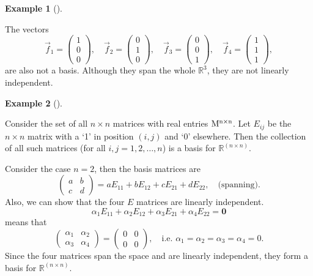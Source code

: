 \documentclass[
  a4paper,
  DIV=11,
  numbers=noendperiod,
  oneside]{scrreprt}
\theoremstyle{definition}
\newtheorem{example}{Example}[chapter]
\theoremstyle{remark}
\begin{document}
\begin{example}[]\protect\hypertarget{exm-}{}\label{exm-}

The vectors
\[\vec{f}_{1} =  \scriptscriptstyle \begin{pmatrix}   1\\ 0 \\ 0   \end{pmatrix} \textstyle, \quad \vec{f}_{2} =  \scriptscriptstyle \begin{pmatrix}   0\\ 1 \\ 0   \end{pmatrix} \textstyle, \quad \vec{f}_{3} =  \scriptscriptstyle \begin{pmatrix}   0\\ 0 \\ 1  \end{pmatrix} \textstyle, \quad  \vec{f}_{4} =  \scriptscriptstyle \begin{pmatrix}   1\\ 1 \\ 1   \end{pmatrix} \textstyle ,\]
are also not a basis. Although they span the whole \(\mathbb{R}^{3}\),
they are not linearly independent.

\end{example}

\begin{example}[]\protect\hypertarget{exm-}{}\label{exm-}

Consider the set of all \(n\times n\) matrices with real entries
\(\rm{M}^{n\times n}\). Let \(E_{ij}\) be the \(n\times n\) matrix with
a `1' in position \((i,j)\) and `0' elsewhere. Then the collection of
all such matrices (for all \(i,j=1,2,\ldots,n\)) is a basis for
\(\mathbb{R}^{(n\times n)}\).

Consider the case \(n=2\), then the basis matrices are
\[\left(\begin{array}{cc}
 a & b\\
 c & d
 \end{array}\right)=aE_{11}+bE_{12}+cE_{21}+dE_{22},\quad\textrm{(spanning)}.\]
Also, we can show that the four \(E\) matrices are linearly independent.
\[\alpha _{1}E_{11}+\alpha _{2}E_{12}+\alpha _{3}E_{21}+\alpha _{4}E_{22}=\mathbf{0}\]
means that \[\left(\begin{array}{cc}
 \alpha _{1} & \alpha _{2}\\
 \alpha _{3} & \alpha _{4}
 \end{array}\right) = \left(\begin{array}{cc}
 0 & 0\\
 0 & 0
 \end{array}\right),\quad\textrm{i.e.   }\alpha _{1}=\alpha _{2}=\alpha _{3}=\alpha _{4}=0.\]
Since the four matrices span the space and are linearly independent,
they form a basis for \(\mathbb{R}^{(n\times n)}\).

\end{example}
\end{document}
